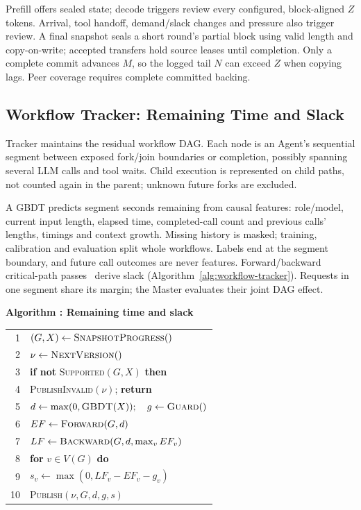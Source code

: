 Prefill offers sealed state; decode triggers review every configured,
block-aligned $Z$ tokens. Arrival, tool handoff, demand/slack changes and
pressure also trigger review. A final snapshot seals a short round's
partial block using valid length and copy-on-write; accepted transfers
hold source leases until completion. Only a complete commit advances
$M$, so the logged tail $N$ can exceed $Z$ when copying lags. Peer coverage
requires complete committed backing.

\subsection{Workflow Tracker: Remaining Time and Slack}
\label{sec:workflow-protection}

Tracker maintains the residual workflow DAG. Each node is an Agent's
sequential segment between exposed fork/join boundaries or completion,
possibly spanning several LLM calls and tool waits. Child execution is
represented on child paths, not counted again in the parent; unknown
future forks are excluded.

A GBDT predicts segment seconds remaining from causal features: role/model,
current input length, elapsed time, completed-call count and previous
calls' lengths, timings and context growth. Missing history is masked;
training, calibration and evaluation split whole workflows. Labels end
at the segment boundary, and future call outcomes are never features.
Forward/backward critical-path passes~\cite{kelley1959cpm} derive slack
(Algorithm~\ref{alg:workflow-tracker}). Requests in one segment share
its margin; the Master evaluates their joint DAG effect.

\par\medskip\noindent\begin{minipage}{\columnwidth}
\raggedright
 \label{alg:workflow-tracker}
 \textbf{Algorithm \thedesignalgorithm: Remaining time and slack}
 \par\smallskip
 \begin{tabularx}{\columnwidth}{@{}r@{\quad}X@{}}
 \toprule
 1 & $(G,X)\gets\textsc{SnapshotProgress}()$ \\
 2 & $\nu\gets\textsc{NextVersion}()$ \\
 3 & \textbf{if not} \textsc{Supported}$(G,X)$ \textbf{then} \\
 4 & \quad \textsc{PublishInvalid}$(\nu)$; \textbf{return} \\
 5 & $d\gets\max(0,\textsc{GBDT}(X));\quad g\gets\textsc{Guard}()$ \\
 6 & $EF\gets\textsc{Forward}(G,d)$ \\
 7 & $LF\gets\textsc{Backward}(G,d,\max_v EF_v)$ \\
 8 & \textbf{for} $v\in V(G)$ \textbf{do} \\
 9 & \quad $s_v\gets\max(0,LF_v-EF_v-g_v)$ \\
 10 & \textsc{Publish}$(\nu,G,d,g,s)$ \\
 \bottomrule
 \end{tabularx}
\end{minipage}\par\medskip

